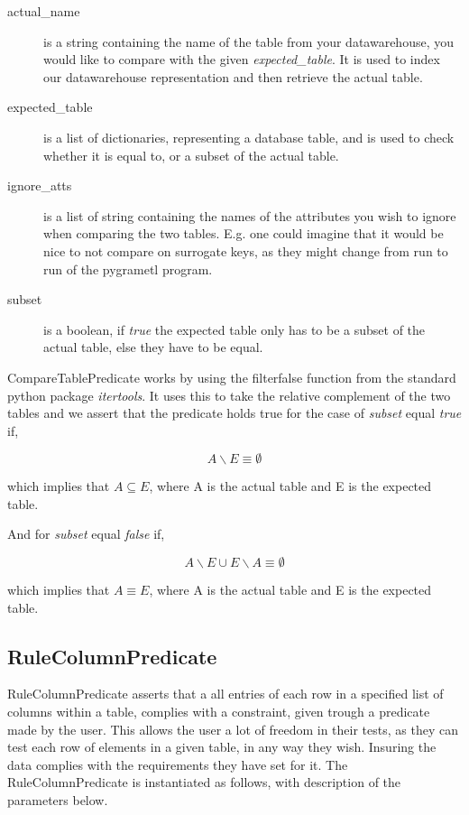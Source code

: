 
\begin{description}
\item [actual\_name] is a string containing the name of the table from your datawarehouse, you would like to compare with the given \textit{expected\_table}. It is used to index our datawarehouse representation and then retrieve the actual table.
\item [expected\_table] is a list of dictionaries, representing a database table, and is used to check whether it is equal to, or a subset of the actual table.
\item [ignore\_atts] is a list of string containing the names of the attributes you wish to ignore when comparing the two tables. E.g. one could imagine that it would be nice to not compare on surrogate keys, as they might change from run to run of the pygrametl program.
  \item [subset] is a boolean, if \textit{true} the expected table only has to be a subset of the actual table, else they have to be equal.
\end{description}

CompareTablePredicate works by using the filterfalse function from the standard python package \textit{itertools}. It uses this to take the relative complement of the two tables and we assert that the predicate holds true for the case of \textit{subset} equal \textit{true} if,

\[ A \backslash E \equiv \emptyset \]

\noindent which implies that $A \subseteq E$, where A is the actual table and E is the expected table.

And for \textit{subset} equal \textit{false} if,

\[ A \backslash E \cup E \backslash A \equiv \emptyset \]

\noindent which implies that $A \equiv E$, where A is the actual table and E is the expected table.

\subsection{RuleColumnPredicate}

RuleColumnPredicate asserts that a all entries of each row in a specified list of columns within a table, complies with a constraint, given trough a predicate made by the user. This allows the user a lot of freedom in their tests, as they can test each row of elements in a given table, in any way they wish. Insuring the data complies with the requirements they have set for it. The RuleColumnPredicate is instantiated as follows, with description of the parameters below.


